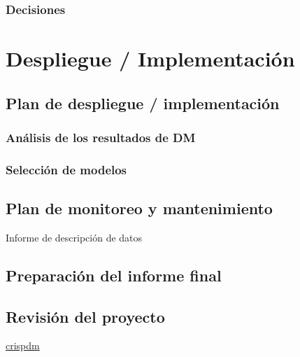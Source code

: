 \documentclass[11pt,a4paper,twoside]{tesis}
\begin{document}
\subsection{Decisiones}


\chapter{Despliegue / Implementación}
\section{Plan de despliegue / implementación}
\subsection{Análisis de los resultados de DM}
\subsection{Selección de modelos}
\section{Plan de monitoreo y mantenimiento}
Informe de descripción de datos
\section{Preparación del informe final}
\section{Revisión del proyecto}


\backmatter



\href{https://www.ibm.com/support/knowledgecenter/es/SS3RA7_sub/modeler_crispdm_ddita/clementine/crisp_help/crisp_overview_container.html}{crispdm}

\listoftodos
\end{document}
